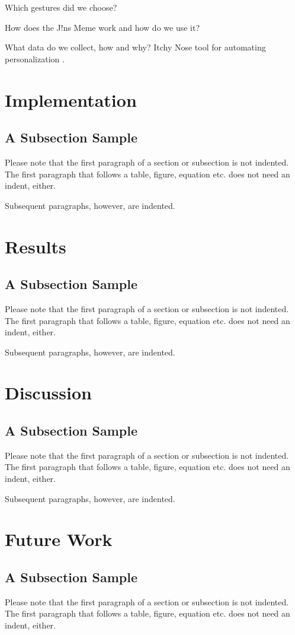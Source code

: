 \documentclass[runningheads]{llncs}
\begin{document}
Which gestures did we choose?

How does the J!ns Meme work and how do we use it?

What data do we collect, how and why?
Itchy Nose tool for automating personalization \cite{10.1145/3174910.3174953}.

\section{Implementation}
\subsection{A Subsection Sample}
Please note that the first paragraph of a section or subsection is
not indented. The first paragraph that follows a table, figure,
equation etc. does not need an indent, either.

Subsequent paragraphs, however, are indented.

\section{Results}
\subsection{A Subsection Sample}
Please note that the first paragraph of a section or subsection is
not indented. The first paragraph that follows a table, figure,
equation etc. does not need an indent, either.

Subsequent paragraphs, however, are indented.

\section{Discussion}
\subsection{A Subsection Sample}
Please note that the first paragraph of a section or subsection is
not indented. The first paragraph that follows a table, figure,
equation etc. does not need an indent, either.

Subsequent paragraphs, however, are indented.

\section{Future Work}
\subsection{A Subsection Sample}
Please note that the first paragraph of a section or subsection is
not indented. The first paragraph that follows a table, figure,
equation etc. does not need an indent, either.
\end{document}
